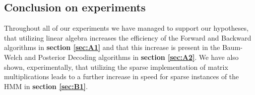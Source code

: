 \subsection{Conclusion on experiments}
Throughout all of our experiments we have managed to support our hypotheses, that utilizing linear algebra increases the efficiency of the Forward and Backward algorithms in \textbf{section \ref{sec:A1}} and that this increase is present in the Baum-Welch and Posterior Decoding algorithms in \textbf{section \ref{sec:A2}}. We have also shown, experimentally, that utilizing the sparse implementation of matrix multiplications leads to a further increase in speed for sparse instances of the HMM in \textbf{section \ref{sec:B1}}.
